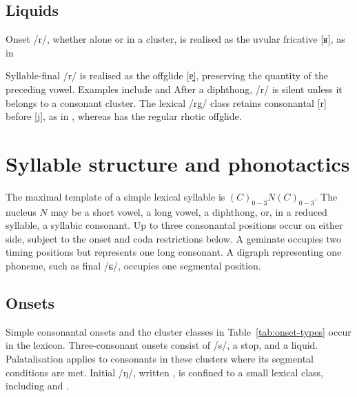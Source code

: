 \subsection{Liquids}
\label{sec:liquids}

Onset /r/, whether alone or in a cluster, is realised as the uvular fricative [ʁ], as in  

Syllable-final /r/ is realised as the offglide [ɐ̯], preserving the quantity of the preceding vowel. Examples include   and  After a diphthong, /r/ is silent unless it belongs to a consonant cluster. The lexical /rg/ class retains consonantal [r] before [j], as in , whereas  has the regular rhotic offglide.

\FloatBarrier
\section{Syllable structure and phonotactics}
\label{sec:syllable-structure}

The maximal template of a simple lexical syllable is $(C)_{0-3}N(C)_{0-3}$. The nucleus $N$ may be a short vowel, a long vowel, a diphthong, or, in a reduced syllable, a syllabic consonant. Up to three consonantal positions occur on either side, subject to the onset and coda restrictions below. A geminate occupies two timing positions but represents one long consonant. A digraph representing one phoneme, such as final  /ɕ/, occupies one segmental position.

\subsection{Onsets}

Simple consonantal onsets and the cluster classes in Table~\ref{tab:onset-types} occur in the lexicon. Three-consonant onsets consist of /s/, a stop, and a liquid. Palatalisation applies to consonants in these clusters where its segmental conditions are met. Initial /ŋ/, written , is confined to a small lexical class, including  and .

